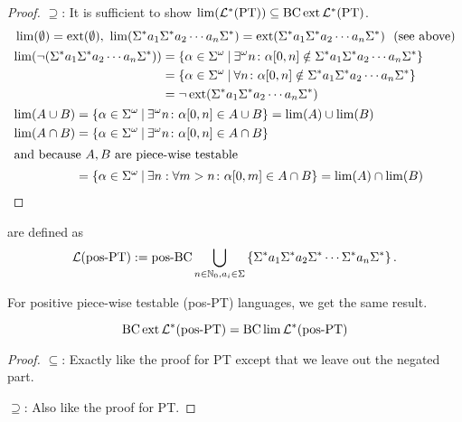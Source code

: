 \begin{theorem}
\begin{proof}
$\supseteq$: It is sufficient to show $\lim(\mathcal{L}^* (\textup{\textrm{PT}})) \subseteq \operatorname{BC} \operatorname{ext} \mathcal{L}^* (\textup{\textrm{PT}})$.
\begin{align*}
& \lim(\emptyset) = \ext(\emptyset), \ \lim(\Sigma^* a_1 \Sigma^* a_2 \dotsb a_n \Sigma^*) = \ext(\Sigma^* a_1 \Sigma^* a_2 \dotsb a_n \Sigma^*) \ \ \text{(see above)} \\
& \begin{aligned}
\lim( \neg ( \Sigma^* a_1 \Sigma^* a_2 \dotsb a_n \Sigma^* ) ) & = \Set{ \alpha \in \Sigma^\omega }{ \exists^\omega n \colon \alpha [0,n] \notin \Sigma^* a_1 \Sigma^* a_2 \dotsb a_n \Sigma^* } \\
& = \Set{ \alpha \in \Sigma^\omega }{ \forall n \colon \alpha [0,n] \notin \Sigma^* a_1 \Sigma^* a_2 \dotsb a_n \Sigma^* } \\
& = \neg \ext( \Sigma^* a_1 \Sigma^* a_2 \dotsb a_n \Sigma^* )
\end{aligned} \\
& \begin{aligned}
\lim(A \cup B) & = \Set{ \alpha \in \Sigma^\omega }{ \exists^\omega n \colon \alpha[0,n] \in A \cup B } = \lim(A) \cup \lim(B) \\
\lim(A \cap B) & = \Set{ \alpha \in \Sigma^\omega }{ \exists^\omega n \colon \alpha[0,n] \in A \cap B } \\
\intertext{and because $A,B$ are piece-wise testable}
& = \Set{ \alpha \in \Sigma^\omega }{ \exists n : \forall m > n \colon \alpha[0,m] \in A \cap B } = \lim(A) \cap \lim(B)
\end{aligned}
\end{align*}
\end{proof}
\end{theorem}



\label{lang:posPT}
 are defined as
\[ \Lang(\mathtext{pos-PT}) := \operatorname{pos-BC} \bigcup_{n\in\N_0,a_i \in \Sigma} \Set{\Sigma^* a_1 \Sigma^* a_2 \Sigma^* \cdots\Sigma^* a_n \Sigma^*} . \]

For positive piece-wise testable (pos-PT) languages, we get the same result.

\begin{theorem}
\label{thm.ext.lim.posPT}
\[ \operatorname{BC} \operatorname{ext} \mathcal{L}^* (\textup{\textrm{pos-PT}}) = \operatorname{BC} \lim \mathcal{L}^* (\textup{\textrm{pos-PT}}) \]
\begin{proof}
$\subseteq$: Exactly like the proof for PT except that we leave out the negated part.

$\supseteq$: Also like the proof for PT.
\end{proof}
\end{theorem}

